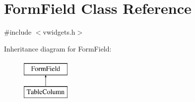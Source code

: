\hypertarget{classFormField}{
\section{FormField Class Reference}
\label{classFormField}
}


{\ttfamily \#include $<$vwidgets.h$>$}

Inheritance diagram for FormField:\begin{figure}[H]
\begin{center}
\leavevmode
\includegraphics[height=2.000000cm]{classFormField}
\end{center}
\end{figure}
